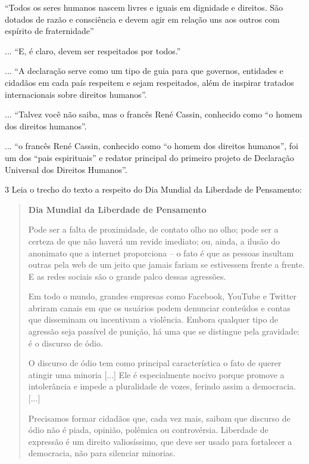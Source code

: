 \begin{conteudo}
\begin{conteudo}
\begin{conteudo}
\begin{conteudo}
\begin{boxlist}
 ``Todos os seres humanos nascem livres e iguais em
dignidade e direitos. São dotados de razão e consciência e devem agir 
em relação uns aos outros com espírito de fraternidade''

 ... ``E, é claro, devem ser respeitados por todos.''

 ... ``A declaração serve como um tipo de guia para que
governos, entidades e cidadãos em cada país respeitem e sejam respeitados,
além de inspirar tratados internacionais sobre direitos humanos''.

 ... ``Talvez você não saiba, mas o francês René Cassin,
conhecido como ``o homem dos direitos humanos''.

 ... ``o francês René Cassin, conhecido como ``o homem 
dos direitos humanos'', foi um dos ``pais espirituais'' e redator principal do
primeiro projeto de Declaração Universal dos Direitos Humanos''.
\end{boxlist}

\num{3} Leia o trecho do texto a respeito do Dia Mundial da Liberdade de
Pensamento:

\begin{quote}
\textbf{Dia Mundial da Liberdade de Pensamento}

Pode ser a falta de proximidade, de contato olho no olho; pode ser a
certeza de que não haverá um revide imediato; ou, ainda, a ilusão do
anonimato que a internet proporciona -- o fato é que as pessoas insultam
outras pela web de um jeito que jamais fariam se estivessem frente a
frente. E as redes sociais são o grande palco dessas agressões.

Em todo o mundo, grandes empresas como Facebook, YouTube e Twitter
abriram canais em que os usuários podem denunciar conteúdos e contas que
disseminam ou incentivam a violência. Embora qualquer tipo de agressão
seja passível de punição, há uma que se distingue pela gravidade: é o
discurso de ódio.

O discurso de ódio tem como principal característica o fato de querer
atingir uma minoria {[}...{]} Ele é especialmente nocivo porque promove
a intolerância e impede a pluralidade de vozes, ferindo assim
a democracia. {[}...{]}

Precisamos formar cidadãos que, cada vez mais, saibam que discurso de
ódio não é piada, opinião, polêmica ou controvérsia. Liberdade de
expressão é um direito valiosíssimo, que deve ser usado para fortalecer
a democracia, não para silenciar minorias.


\end{quote}
\end{conteudo}
\end{conteudo}
\end{conteudo}
\end{conteudo}
